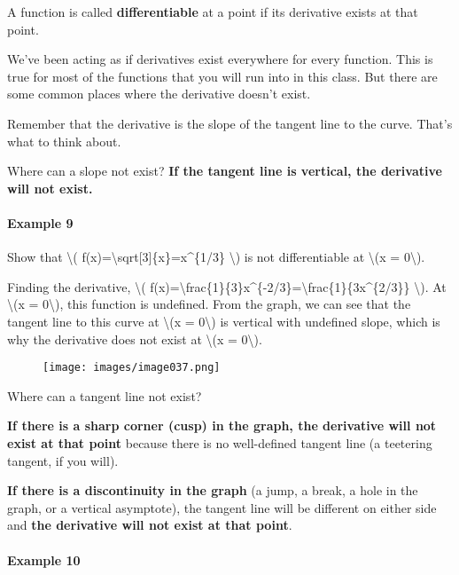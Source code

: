 A function is called \textbf{differentiable} at a point if its
derivative exists at that point.

We've been acting as if derivatives exist everywhere for every function.
This is true for most of the functions that you will run into in this
class. But there are some common places where the derivative doesn't
exist.

Remember that the derivative is the slope of the tangent line to the
curve. That's what to think about.

Where can a slope not exist? \textbf{If the tangent line is vertical,
the derivative will not exist.}

\hypertarget{example-9}{%
\paragraph{Example 9}\label{example-9}}

Show that \textbackslash{}(
f(x)=\textbackslash{}sqrt{[}3{]}\{x\}=x\^{}\{1/3\} \textbackslash{}) is
not differentiable at \textbackslash{}(x = 0\textbackslash{}).

Finding the derivative, \textbackslash{}(
f(x)=\textbackslash{}frac\{1\}\{3\}x\^{}\{-2/3\}=\textbackslash{}frac\{1\}\{3x\^{}\{2/3\}\}
\textbackslash{}). At \textbackslash{}(x = 0\textbackslash{}), this
function is undefined. From the graph, we can see that the tangent line
to this curve at \textbackslash{}(x = 0\textbackslash{}) is vertical
with undefined slope, which is why the derivative does not exist at
\textbackslash{}(x = 0\textbackslash{}).

\begin{figure}
\centering
\texttt{[image: images/image037.png]}
\caption{}
\end{figure}

Where can a tangent line not exist?

\textbf{If there is a sharp corner (cusp) in the graph, the derivative
will not exist at that point} because there is no well-defined tangent
line (a teetering tangent, if you will).

\textbf{If there is a discontinuity in the graph} (a jump, a break, a
hole in the graph, or a vertical asymptote), the tangent line will be
different on either side and \textbf{the derivative will not exist at
that point}.

\hypertarget{example-10}{%
\paragraph{Example 10}\label{example-10}}

